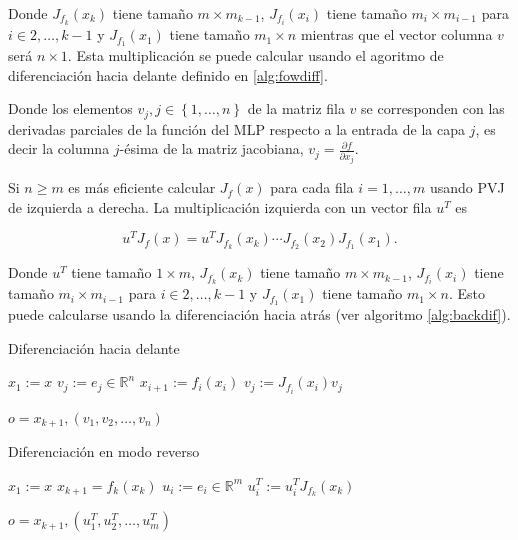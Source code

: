 Donde $J_{f_k}(x_k)$ tiene tamaño $m \times m_{k-1}$, $J_{f_i}(x_i)$ tiene tamaño $m_i \times m_{i-1}$ para $i \in {2,\ldots,k-1}$ y $J_{f_1}(x_1)$ tiene tamaño $m_1 \times n$ mientras que el vector columna $v$ será $n \times 1$. Esta multiplicación se puede calcular usando el agoritmo de diferenciación hacia delante definido en \ref{alg:fowdiff}.


Donde los elementos $v_j, j \in \left \{1,\ldots,n \right \}$ de la matriz fila $v$ se corresponden con las derivadas parciales de la función del MLP respecto a la entrada de la capa $j$, es decir la columna $j$-ésima de la matriz jacobiana, $v_j=\frac{\partial f}{\partial x_j}$. 

Si $n\geq m$ es más eficiente calcular $J_f(x)$ para cada fila $i=1,\ldots,m$ usando PVJ de izquierda a derecha. La multiplicación izquierda con un vector fila $u^T$ es 

$$u^TJ_f(x)=u^TJ_{f_k}(x_k) \cdots J_{f_2}(x_2) J_{f_1}(x_1).$$

Donde $u^T$ tiene tamaño $1 \times m$,  $J_{f_k}(x_k)$ tiene tamaño $m \times m_{k-1}$, $J_{f_i}(x_i)$ tiene tamaño $m_i \times m_{i-1}$ para $i \in {2,\ldots,k-1}$ y $J_{f_1}(x_1)$ tiene tamaño $m_1 \times n$. Esto puede calcularse usando la diferenciación hacia atrás (ver algoritmo \ref{alg:backdif}).

 
\begin{algorithm}[H]
\caption{Diferenciación hacia delante}
\label{alg:fowdiff}
    \begin{algorithmic}
        \State $x_1 := x$
            \State $v_j := e_j \in \mathbb{R}^n$
        \EndFor
            \State $x_{i+1}:=f_i(x_i)$
                \State $v_j:= J_{f_i}(x_i)v_j$
            \EndFor
        \EndFor 

        
         \Return $o=x_{k+1}, \left (v_1, v_2, \ldots, v_n \right )$
        
    \end{algorithmic}
\end{algorithm}


\begin{algorithm}
\caption{Diferenciación en modo reverso}
\label{alg:backdif}
    \begin{algorithmic}
        \State $x_1:=x$
            \State $x_{k+1} = f_k(x_k)$
        \EndFor
            \State $u_i:=e_i \in \mathbb{R}^m$
        \EndFor 
                \State $u_i^T:= u_i^T J_{f_k}(x_k)$
            \EndFor
        \EndFor 

        \Return $o=x_{k+1}, \left ( u_1^T, u_2^T, \ldots, u_m^T \right )$
    \end{algorithmic}
\end{algorithm}

